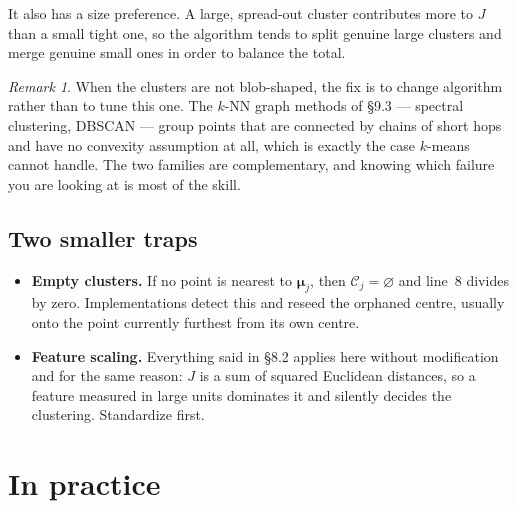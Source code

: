 \documentclass[11pt]{article}
\theoremstyle{plain}
\theoremstyle{definition}
\theoremstyle{remark}
\newtheorem*{rmk}{Remark}
\newcommand{\Cl}{\mathcal{C}}
\newcommand{\bmu}{\boldsymbol{\mu}}
\begin{document}
It also has a size preference. A large, spread-out cluster contributes more to
$J$ than a small tight one, so the algorithm tends to split genuine large
clusters and merge genuine small ones in order to balance the total.

\begin{rmk}
When the clusters are not blob-shaped, the fix is to change algorithm rather
than to tune this one. The $k$-NN graph methods of \S9.3 --- spectral
clustering, DBSCAN --- group points that are connected by chains of short hops
and have no convexity assumption at all, which is exactly the case $k$-means
cannot handle. The two families are complementary, and knowing which failure
you are looking at is most of the skill.
\end{rmk}

\subsection{Two smaller traps}
\begin{itemize}[leftmargin=1.4em,itemsep=4pt]
  \item \textbf{Empty clusters.} If no point is nearest to $\bmu_j$, then
        $\Cl_j=\varnothing$ and line~8 divides by zero. Implementations detect
        this and reseed the orphaned centre, usually onto the point currently
        furthest from its own centre.
  \item \textbf{Feature scaling.} Everything said in \S8.2 applies here without
        modification and for the same reason: $J$ is a sum of squared Euclidean
        distances, so a feature measured in large units dominates it and
        silently decides the clustering. Standardize first.
\end{itemize}

\section{In practice}
\end{document}
